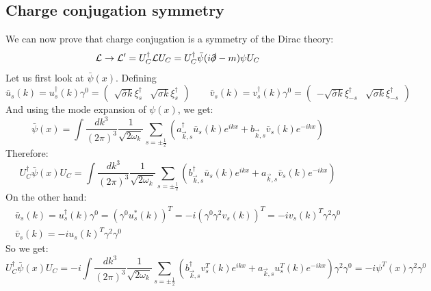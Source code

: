 \documentclass{article}
\begin{document}
\subsection{Charge conjugation symmetry}
We can now prove that charge conjugation is a symmetry of the Dirac theory:
\begin{equation}
    \mathcal{L} \rightarrow \mathcal{L}' = U_C^\dagger \mathcal{L} U_C =
    U_C^\dagger \bar{\psi}(i\slashed{\partial} - m)\psi U_C
\end{equation}
Let us first look at $\bar{\psi}(x)$. Defining
\begin{equation}
    \bar{u}_s(k) = u_s^\dagger(k)\gamma^0 = \begin{pmatrix} \sqrt{\bar{\sigma} k} \xi_s^\dagger & \sqrt{\sigma k} \xi_s^\dagger \end{pmatrix}
    \qquad
    \bar{v}_s(k) = v_s^\dagger(k)\gamma^0 = \begin{pmatrix} -\sqrt{\bar{\sigma} k} \xi_{-s}^\dagger & \sqrt{\sigma k} \xi_{-s}^\dagger \end{pmatrix}
\end{equation}
And using the mode expansion of $\psi(x)$, we get:
\begin{equation}
\label{eq:dirac-field-bar}
    \bar{\psi}(x) = \int \frac{dk^3}{(2\pi)^3}\frac{1}{\sqrt{2\omega_k}}\sum_{s=\pm\frac{1}{2}} \left(
        a_{\vec{k}, s}^\dagger\bar{u}_s(k)e^{ikx} + b_{\vec{k}, s} \bar{v}_s(k)e^{-ikx}
    \right)
\end{equation}
Therefore:
\begin{equation}
    U_C^\dagger \bar{\psi}(x) U_C = \int \frac{dk^3}{(2\pi)^3}\frac{1}{\sqrt{2\omega_k}}\sum_{s=\pm\frac{1}{2}} \left(
        b_{\vec{k}, s}^\dagger\bar{u}_s(k)e^{ikx} + a_{\vec{k}, s} \bar{v}_s(k)e^{-ikx}
    \right)
\end{equation}
On the other hand:
\begin{equation}
\begin{gathered}
    \bar{u}_s(k) = u_s^\dagger(k)\gamma^0 =
    \left(\gamma^0 u_s^*(k)\right)^T = 
    -i\left(\gamma^0\gamma^2 v_s(k)\right)^T = 
    -i v_s(k)^T\gamma^2\gamma^0
    \\
    \bar{v}_s(k) = -i u_s(k)^T\gamma^2\gamma^0
\end{gathered}
\end{equation}
So we get:
\begin{equation}
    U_C^\dagger \bar{\psi}(x) U_C = -i\int \frac{dk^3}{(2\pi)^3}\frac{1}{\sqrt{2\omega_k}}\sum_{s=\pm\frac{1}{2}} \left(
        b_{\vec{k}, s}^\dagger v_s^T(k)e^{ikx} + a_{\vec{k}, s} u^T_s(k)e^{-ikx}
    \right)\gamma^2\gamma^0 = -i\psi^T(x)\gamma^2\gamma^0
\end{equation}
\end{document}
